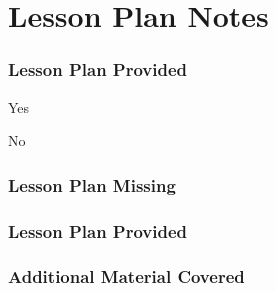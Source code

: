 \documentclass[10pt]{article}
\begin{document}
\section*{Lesson Plan Notes}
\begin{framed}

\subsubsection*{Lesson Plan Provided}

\begin{todolist}
    \item Yes
    \item No
\end{todolist}

\subsubsection*{Lesson Plan Missing}
\begin{description}
    \item[\small{Material Presented}] \uline{\hfill\null}
    \item \uline{\hfill\null}
    \item \uline{\hfill\null}
\end{description}


\subsubsection*{Lesson Plan Provided}
\begin{description}
    \item \uline{\hfill\null}
    \item \uline{\hfill\null}
    \item \uline{\hfill\null}
\end{description}


\subsubsection*{Additional Material Covered}
\begin{description}
    \item \uline{\hfill\null}
    \item \uline{\hfill\null}
\end{description}

\vspace{0.2in}


\end{framed}
\end{document}
